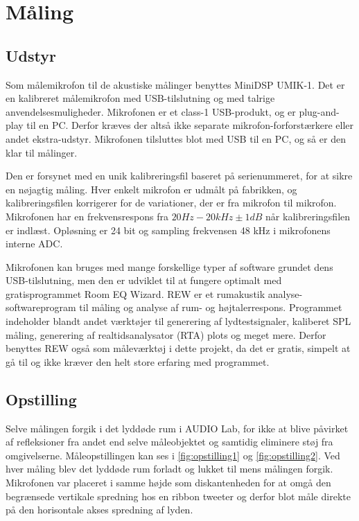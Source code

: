 \section{Måling}

\subsection{Udstyr}
Som målemikrofon til de akustiske målinger benyttes MiniDSP UMIK-1. Det er en kalibreret målemikrofon med USB-tilslutning og med talrige anvendelsesmuligheder. Mikrofonen er et class-1 USB-produkt, og er plug-and-play til en PC. Derfor kræves der altså ikke separate mikrofon-forforstærkere eller andet ekstra-udstyr. Mikrofonen tilsluttes blot med USB til en PC, og så er den klar til målinger.

Den er forsynet med en unik kalibreringsfil baseret på serienummeret, for at sikre en nøjagtig måling. Hver enkelt mikrofon er udmålt på fabrikken, og kalibreringsfilen korrigerer for de variationer, der er fra mikrofon til mikrofon. Mikrofonen har en frekvensrespons fra $ 20Hz - 20kHz \pm1dB $ når kalibreringsfilen er indlæst. Opløsning er 24 bit og sampling frekvensen 48 kHz i mikrofonens interne ADC.

Mikrofonen kan bruges med mange forskellige typer af software grundet dens USB-tilslutning, men den er udviklet til at fungere optimalt med gratisprogrammet Room EQ Wizard. REW er et rumakustik analyse-softwareprogram til måling og analyse af rum- og højtalerrespons. Programmet indeholder blandt andet værktøjer til generering af lydtestsignaler, kaliberet SPL måling, generering af realtidsanalysator (RTA) plots og meget mere. Derfor benyttes REW også som måleværktøj i dette projekt, da det er gratis, simpelt at gå til og ikke kræver den helt store erfaring med programmet. 

\subsection{Opstilling}
Selve målingen forgik i det lyddøde rum i AUDIO Lab, for ikke at blive påvirket af refleksioner fra andet end selve måleobjektet og samtidig eliminere støj fra omgivelserne.  Måleopstillingen kan ses i \autoref{fig:opstilling1} og \autoref{fig:opstilling2}. Ved hver måling blev det lyddøde rum forladt og lukket til mens målingen forgik. Mikrofonen var placeret i samme højde som diskantenheden for at omgå den begrænsede vertikale spredning hos en ribbon tweeter og derfor blot måle direkte på den horisontale akses spredning af lyden. 


